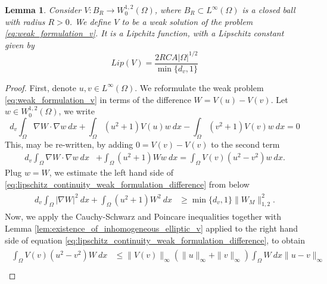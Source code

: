 \documentclass[12pt, a4paper]{article}
\theoremstyle{break}
\theoremstyle{break}
\theoremstyle{break}
\theoremstyle{break}
\theoremstyle{break}
\newtheorem{lem}{Lemma}[section]
\theoremstyle{break}
\theoremstyle{break}
\begin{document}
\begin{lem}
    \label{eq:stationary_v_lipschitz_constant}
    Consider $V : B_R \rightarrow W^{1,2}_0(\Omega)$, where $B_R \subset L^\infty(\Omega)$ is a closed ball with radius $R > 0$. We define $V$ to be a weak solution of the problem \eqref{eq:weak_formulation_v}. It is a Lipchitz function, with a Lipschitz constant given by
    \begin{equation}
        Lip(V) = \frac{2R C A |\Omega|^{1/2}}{\min\{d_v, 1\}}
    \end{equation}
\end{lem}

\begin{proof}
    First, denote $u, v \in L^\infty(\Omega)$. We reformulate the weak problem \eqref{eq:weak_formulation_v} in terms of the difference $W = V(u) - V(v)$. Let $w \in W^{1,2}_0(\Omega)$, we write
    \begin{equation*}
        d_v \int_\Omega \nabla W \cdot \nabla w \:dx + \int_\Omega (u^2 + 1) V(u) w \:dx - \int_\Omega (v^2 + 1) V(v) w \:dx = 0
    \end{equation*}
    This, may be re-written, by adding $0 = V(v) - V(v)$ to the second term
    \begin{align}
        \label{eq:lipschitz_continuity_weak_formulation_difference}
        d_v \int_\Omega \nabla W \cdot \nabla w \:dx &+ \int_\Omega (u^2 + 1) W w \:dx = \int_\Omega V(v) (u^2 - v^2) w \:dx.
    \end{align}
    Plug $w = W$, we estimate the left hand side of \eqref{eq:lipschitz_continuity_weak_formulation_difference} from below
    \begin{align}
        \label{eq:ineaulity_lhs_lipschitz_cont}
        \begin{split}
            d_v \int_\Omega |\nabla W|^2\:dx + \int_\Omega (u^2 + 1) W^2 \:dx
            &\geq
            \min\{d_v, 1\} \| W_M \|_{1, 2}^2.
        \end{split}
    \end{align}
    Now, we apply the Cauchy-Schwarz and Poincare inequalities together with Lemma \ref{lem:existence_of_inhomogeneous_elliptic_v} applied to the right hand side of equation \eqref{eq:lipschitz_continuity_weak_formulation_difference}, to obtain
    \begin{align}
        \label{eq:ineaulity_rhs_lipschitz_cont}
        \begin{split}
            \int_\Omega V(v) \left( u^2 - v^2 \right) W  \:dx 
            &\leq
            \|V(v)\|_\infty (\|u\|_\infty + \|v\|_\infty) \int_\Omega W\:dx \|u-v\|_\infty\\

\end{split}
\end{align}
\end{proof}
\end{document}
